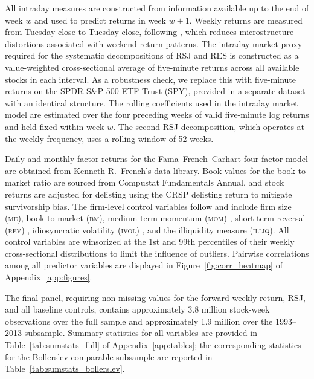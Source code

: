 \documentclass[11pt,a4paper]{article}
\begin{document}
All intraday measures are constructed from information available up to the end of week $w$
and used to predict returns in week $w+1$. Weekly returns are measured from Tuesday close
to Tuesday close, following \citet{amaya2015}, which reduces microstructure distortions
associated with weekend return patterns. The intraday market proxy required for the
systematic decompositions of RSJ and RES is constructed as a value-weighted
cross-sectional average of five-minute returns across all available stocks in each
interval. As a robustness check, we replace this with five-minute returns on the SPDR
S\&P 500 ETF Trust (SPY), provided in a separate dataset with an identical structure. The
rolling coefficients used in the intraday market model are estimated over the four
preceding weeks of valid five-minute log returns and held fixed within week $w$. The
second RSJ decomposition, which operates at the weekly frequency, uses a rolling window
of 52 weeks.

Daily and monthly factor returns for the Fama--French--Carhart four-factor model are
obtained from Kenneth R.\ French's data library. Book values for the book-to-market ratio
are sourced from Compustat Fundamentals Annual, and stock returns are adjusted for
delisting using the CRSP delisting return to mitigate survivorship bias. The firm-level
control variables follow \citet{bollerslev2020} and include firm size (\textsc{me}),
book-to-market (\textsc{bm}), medium-term momentum (\textsc{mom}) \citep{jegadeesh1993},
short-term reversal (\textsc{rev}) \citep{lehmann1990, jegadeesh1990}, idiosyncratic
volatility (\textsc{ivol}) \citep{ang2006}, and the \citet{amihud2002} illiquidity
measure (\textsc{illiq}). All control variables are winsorized at the 1st and 99th
percentiles of their weekly cross-sectional distributions to limit the influence of
outliers. Pairwise correlations among all predictor variables are displayed in
Figure~\ref{fig:corr_heatmap} of Appendix~\ref{app:figures}.

The final panel, requiring non-missing values for the forward weekly return, RSJ, and all
baseline controls, contains approximately 3.8 million stock-week observations over the
full sample and approximately 1.9 million over the 1993--2013 subsample. Summary
statistics for all variables are provided in Table~\ref{tab:sumstats_full} of
Appendix~\ref{app:tables}; the corresponding statistics for the Bollerslev-comparable
subsample are reported in Table~\ref{tab:sumstats_bollerslev}.
\end{document}
